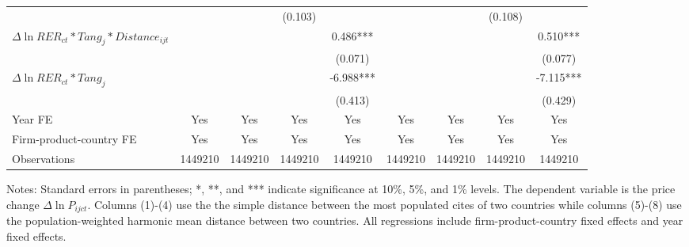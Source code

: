\documentclass[12pt]{article}
\begin{document}
\begin{table}
{\begin{threeparttable}
\begin{tabular}{lcccccccc}
				&       &       & (0.103) &  &       &       & (0.108) &\\
				$\Delta \ln RER_{ct}*Tang_{j}*Distance_{ijt}$ &       &       &       & 0.486***
				&       &       &       & 0.510***\\
				&       &       &       & (0.071) &       &       &       & (0.077)\\
				$\Delta \ln RER_{ct}*Tang_{j}$ &       &       &       & -6.988*** &       &       &       & -7.115***\\
				&       &       &       & (0.413) &       &       &       & (0.429)\\
				Year FE  & Yes   & Yes   & Yes   & Yes & Yes   & Yes   & Yes   & Yes\\
				Firm-product-country FE & Yes   & Yes   & Yes   & Yes & Yes   & Yes   & Yes   & Yes\\
				Observations & 1449210 & 1449210 & 1449210 & 1449210 & 1449210 & 1449210 & 1449210 & 1449210\\
				\bottomrule
			\end{tabular}
			\begin{tablenotes}
				\footnotesize
				\item[Notes:] Standard errors in parentheses; *, **, and *** indicate significance at 10\%, 5\%, and 1\% levels. The dependent variable is the price change $\Delta \ln P_{ijct}$. Columns (1)-(4) use the the simple distance between the most populated cites of two countries while columns (5)-(8) use the population-weighted harmonic mean distance between two countries. All regressions include firm-product-country fixed effects and year fixed effects.
			\end{tablenotes}
		\end{threeparttable}
	}
	\label{tab.source.distance}
\end{table}
\end{document}
